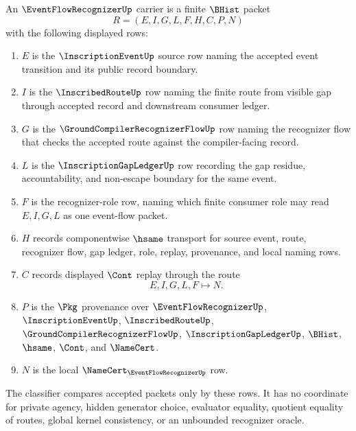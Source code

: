 \begin{definition}
\label{def:event-flow-recognizer-carrier}
An $\EventFlowRecognizerUp$ carrier is a finite $\BHist$ packet
$$
R=(E,I,G,L,F,H,C,P,N)
$$
with the following displayed rows:
\begin{enumerate}
\item $E$ is the $\InscriptionEventUp$ source row naming the accepted event transition and its public record boundary.
\item $I$ is the $\InscribedRouteUp$ row naming the finite route from visible gap through accepted record and downstream consumer ledger.
\item $G$ is the $\GroundCompilerRecognizerFlowUp$ row naming the recognizer flow that checks the accepted route against the compiler-facing record.
\item $L$ is the $\InscriptionGapLedgerUp$ row recording the gap residue, accountability, and non-escape boundary for the same event.
\item $F$ is the recognizer-role row, naming which finite consumer role may read $E,I,G,L$ as one event-flow packet.
\item $H$ records componentwise $\hsame$ transport for source event, route, recognizer flow, gap ledger, role, replay, provenance, and local naming rows.
\item $C$ records displayed $\Cont$ replay through the route
$$
E,I,G,L,F \longmapsto N .
$$
\item $P$ is the $\Pkg$ provenance over $\EventFlowRecognizerUp$, $\InscriptionEventUp$, $\InscribedRouteUp$, $\GroundCompilerRecognizerFlowUp$, $\InscriptionGapLedgerUp$, $\BHist$, $\hsame$, $\Cont$, and $\NameCert$.
\item $N$ is the local $\NameCert_{\EventFlowRecognizerUp}$ row.
\end{enumerate}
The classifier compares accepted packets only by these rows. It has no coordinate for private agency, hidden generator choice, evaluator equality, quotient equality of routes, global kernel consistency, or an unbounded recognizer oracle.
\end{definition}

